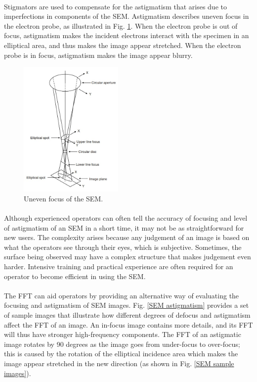 \documentclass[12pt, twocolumn]{report}
\begin{document}
\paragraph{}
Stigmators are used to compensate for the astigmatism that arises due to imperfections in components of the SEM. Astigmatism describes uneven focus in the electron probe, as illustrated in Fig. \ref{SEM uneven focus}. When the electron probe is out of focus, astigmatism makes the incident electrons interact with the specimen in an elliptical area, and thus makes the image appear stretched. When the electron probe is in focus, astigmatism makes the image appear blurry.

\begin{figure}[htbp]
    \centering
    \includegraphics[width=0.45\textwidth]{Figures/SEM uneven focus.jpg}
    \caption{Uneven focus of the SEM.}
    \label{SEM uneven focus}
\end{figure}

\paragraph{}
Although experienced operators can often tell the accuracy of focusing and level of astigmatism of an SEM in a short time, it may not be as straightforward for new users. The complexity arises because any judgement of an image is based on what the operators see through their eyes, which is subjective. Sometimes, the surface being observed may have a complex structure that makes judgement even harder. Intensive training and practical experience are often required for an operator to become efficient in using the SEM.

\paragraph{}
The FFT can aid operators by providing an alternative way of evaluating the focusing and astigmatism of SEM images. Fig. \ref{SEM astigmatism} provides a set of sample images that illustrate how different degrees of defocus and astigmatism affect the FFT of an image. An in-focus image contains more details, and its FFT will thus have stronger high-frequency components. The FFT of an astigmatic image rotates by 90 degrees as the image goes from under-focus to over-focus; this is caused by the rotation of the elliptical incidence area which makes the image appear stretched in the new direction (as shown in Fig. \ref{SEM sample images}).
\end{document}
